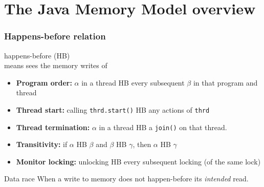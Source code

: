 \documentclass[aspectratio=169]{beamer}
\begin{document}
\section{The Java Memory Model overview}

\begin{frame}\frametitle{Happens-before relation}
\centering

 \alert{happens-before (HB)} \\
means   sees the memory writes of 

\begin{itemize}
\item \textbf{Program order:} $\alpha$ in a thread \alert{HB} every subsequent $\beta$ in that program and thread
\item \textbf{Thread start:} calling \texttt{thrd.start()} \alert{HB} any actions of \texttt{thrd}
\item \textbf{Thread termination:} $\alpha$ in a thread \alert{HB} a \texttt{join()} on that thread.
\item \textbf{Transitivity:} if $\alpha$ \alert{HB} $\beta$ and $\beta$ \alert{HB} $\gamma$, then $\alpha$ \alert{HB} $\gamma$
\item \textbf{Monitor locking:} unlocking \alert{HB} every subsequent locking (of the same lock)
\end{itemize}

\begin{alertblock}{Data race}
When a write to memory does not \alert{happen-before} its \emph{intended} read.
\end{alertblock}

\end{frame}
\end{document}
